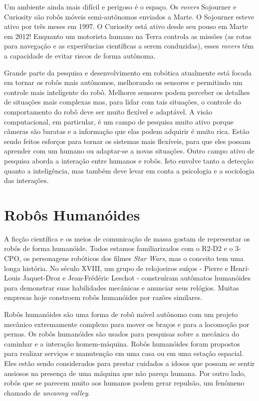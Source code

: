 Um ambiente ainda mais difícil e perigoso é o espaço. Os \emph{rovers} Sojourner e Curiosity são robôs móveis semi-autônomos enviados a Marte. O Sojourner esteve ativo por três meses em 1997. O Curiosity está ativo desde seu pouso em Marte em 2012! Enquanto um motorista humano na Terra controla as missões (as rotas para navegação e as experiências científicas a serem conduzidas), esses \emph{rovers} têm a capacidade de evitar riscos de forma autônoma.

Grande parte da pesquisa e desenvolvimento em robótica atualmente está focada em tornar os robôs mais autônomos, melhorando os sensores e permitindo um controle mais inteligente do robô. Melhores sensores podem perceber os detalhes de situações mais complexas mas, para lidar com tais situações, o controle do comportamento do robô deve ser muito flexível e adaptável. A visão computacional, em particular, é um campo de pesquisa muito ativo porque câmeras são baratas e a informação que elas podem adquirir é muito rica. Estão sendo feitos esforços para tornar os sistemas mais flexíveis, para que eles possam aprender com um humano ou adaptar-se a novas situações. Outro campo ativo de pesquisa aborda a interação entre humanos e robôs. Isto envolve tanto a detecção quanto a inteligência, mas também deve levar em conta a psicologia e a sociologia das interações.

\section{Robôs Humanóides}

A ficção científica e os meios de comunicação de massa gostam de representar os robôs de forma humanóide. Todos estamos familiarizados com o R2-D2 e o 3-CPO, os personagens robóticos dos filmes \emph{Star Wars}, mas o conceito tem uma longa história. No século XVIII, um grupo de relojoeiros suíços - Pierre e Henri-Louis Jaquet-Droz e Jean-Fr\'{e}d\'{e}ric Leschot - construíram autômatos humanóides para demonstrar suas habilidades mecânicas e anunciar seus relógios. Muitas empresas hoje constroem robôs humanóides por razões similares.

Robôs humanóides são uma forma de robô móvel autônomo com um projeto mecânico extremamente complexo para mover os braços e para a locomoção por pernas. Os robôs humanóides são usados para pesquisas sobre a mecânica do caminhar e a interação homem-máquina. Robôs humanóides foram propostos para realizar serviços e manutenção em uma casa ou em uma estação espacial. Eles estão sendo considerados para prestar cuidados a idosos que possam se sentir ansiosos na presença de uma máquina que não pareça humana. Por outro lado, robôs que se parecem muito aos humanos podem gerar repulsão, um fenômeno chamado de \emph{uncanny valley}.

